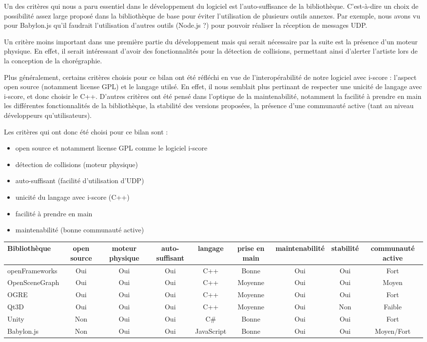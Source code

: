 Un des critères qui nous a paru essentiel dans le développement du logiciel est l'auto-suffisance de la bibliothèque. C'est-à-dire un choix de possibilité assez large proposé dans la bibliothèque de base pour éviter l'utilisation de plusieurs outils annexes. Par exemple, nous avons vu pour Babylon.js qu'il faudrait l'utilisation d'autres outils (Node.js ?) pour pouvoir réaliser la réception de messages UDP. 

Un critère moins important dans une première partie du développement mais qui serait nécessaire par la suite est la présence d'un moteur physique. En effet, il serait intéressant d'avoir des fonctionnalités pour la détection de collisions, permettant ainsi d'alerter l'artiste lors de la conception de la chorégraphie.

Plus généralement, certains critères choisis pour ce bilan ont été réfléchi en vue de l'interopérabilité de notre logiciel avec i-score : l'aspect open source (notamment license GPL) et le langage utilsé. En effet, il nous semblait plus pertinant de respecter une unicité de langage avec i-score, et donc choisir le C++. 
D'autres critères ont été pensé dans l'optique de la maintenabilité, notamment la facilité à prendre en main les différentes fonctionnalités de la bibliothèque, la stabilité des versions proposées, la présence d'une communauté active (tant au niveau développeurs qu'utilisateurs).



Les critères qui ont donc été choisi pour ce bilan sont : 
\begin{itemize}
\item open source et notamment license GPL comme le logiciel i-score 
\item détection de collisions (moteur physique)
\item auto-suffisant (facilité d'utilisation d'UDP)
\item unicité du langage avec i-score (C++)
\item facilité à prendre en main
\item maintenabilité (bonne communauté active)
\end{itemize} 
 

\newpage
\begin{landscape}
\hspace{-4.5cm} 
\begin{tabular}{l|c|c|c|c|c|c|c|c}
Bibliothèque & open source & moteur physique & auto-suffisant & langage & prise en main & maintenabilité & stabilité & communauté active\\
\hline
openFrameworks & Oui & Oui & Oui & C++ & Bonne & Oui & Oui & Fort\\
OpenSceneGraph & Oui & Oui & Oui & C++ & Moyenne & Oui & Oui & Moyen\\ 
OGRE & Oui & Oui & Oui & C++ & Moyenne & Oui & Oui & Fort\\
Qt3D & Oui & Oui & Oui & C++ & Moyenne & Oui & Non & Faible\\
Unity & Non & Oui & Oui & C\# & Bonne & Oui & Oui & Fort\\
Babylon.js  & Non & Oui & Oui & JavaScript & Bonne & Oui & Oui & Moyen/Fort
\end{tabular}
\end{landscape}

